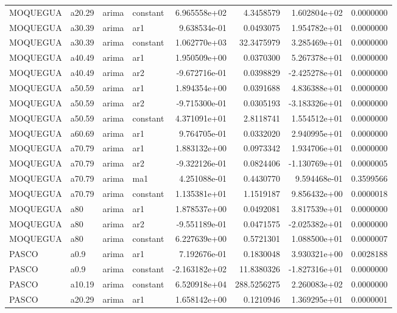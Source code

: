 \documentclass[
]{article}
\begin{document}
\begin{table}[!h]
\begin{tabular}[t]{llllrrrr}
MOQUEGUA & a20.29 & arima & constant & 6.965558e+02 & 4.3458579 & 1.602804e+02 & 0.0000000\\
MOQUEGUA & a30.39 & arima & ar1 & 9.638534e-01 & 0.0493075 & 1.954782e+01 & 0.0000000\\
MOQUEGUA & a30.39 & arima & constant & 1.062770e+03 & 32.3475979 & 3.285469e+01 & 0.0000000\\
\addlinespace
MOQUEGUA & a40.49 & arima & ar1 & 1.950509e+00 & 0.0370300 & 5.267378e+01 & 0.0000000\\
MOQUEGUA & a40.49 & arima & ar2 & -9.672716e-01 & 0.0398829 & -2.425278e+01 & 0.0000000\\
MOQUEGUA & a50.59 & arima & ar1 & 1.894354e+00 & 0.0391688 & 4.836388e+01 & 0.0000000\\
MOQUEGUA & a50.59 & arima & ar2 & -9.715300e-01 & 0.0305193 & -3.183326e+01 & 0.0000000\\
MOQUEGUA & a50.59 & arima & constant & 4.371091e+01 & 2.8118741 & 1.554512e+01 & 0.0000000\\
\addlinespace
MOQUEGUA & a60.69 & arima & ar1 & 9.764705e-01 & 0.0332020 & 2.940995e+01 & 0.0000000\\
MOQUEGUA & a70.79 & arima & ar1 & 1.883132e+00 & 0.0973342 & 1.934706e+01 & 0.0000000\\
MOQUEGUA & a70.79 & arima & ar2 & -9.322126e-01 & 0.0824406 & -1.130769e+01 & 0.0000005\\
MOQUEGUA & a70.79 & arima & ma1 & 4.251088e-01 & 0.4430770 & 9.594468e-01 & 0.3599566\\
MOQUEGUA & a70.79 & arima & constant & 1.135381e+01 & 1.1519187 & 9.856432e+00 & 0.0000018\\
\addlinespace
MOQUEGUA & a80 & arima & ar1 & 1.878537e+00 & 0.0492081 & 3.817539e+01 & 0.0000000\\
MOQUEGUA & a80 & arima & ar2 & -9.551189e-01 & 0.0471575 & -2.025382e+01 & 0.0000000\\
MOQUEGUA & a80 & arima & constant & 6.227639e+00 & 0.5721301 & 1.088500e+01 & 0.0000007\\
PASCO & a0.9 & arima & ar1 & 7.192676e-01 & 0.1830048 & 3.930321e+00 & 0.0028188\\
PASCO & a0.9 & arima & constant & -2.163182e+02 & 11.8380326 & -1.827316e+01 & 0.0000000\\
\addlinespace
PASCO & a10.19 & arima & constant & 6.520918e+04 & 288.5256275 & 2.260083e+02 & 0.0000000\\
PASCO & a20.29 & arima & ar1 & 1.658142e+00 & 0.1210946 & 1.369295e+01 & 0.0000001\\

\end{tabular}
\end{table}
\end{document}
